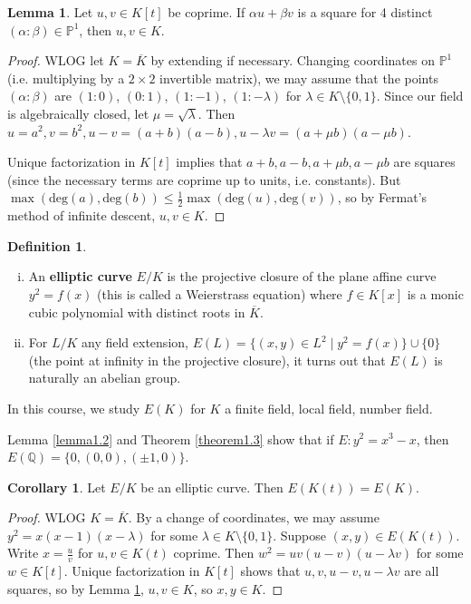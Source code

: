 \documentclass{article}
\theoremstyle{definition}
\newtheorem{lemma}[theorem]{Lemma}
\newtheorem{cor}[theorem]{Corollary}
\newtheorem{defn}{Definition}[section]
\begin{document}
\begin{lemma}\label{lemma1.4}
    Let $u,v \in K[t]$ be coprime. If $\alpha u + \beta v$ is a square for 4 distinct $(\alpha : \beta) \in \mathbb{P}^1$, then $u, v \in K$.
\end{lemma}
\begin{proof}
    WLOG let $K = \overline{K}$ by extending if necessary. Changing coordinates on $\mathbb{P}^1$ (i.e. multiplying by a $2 \times 2$ invertible matrix), we may assume that the points $(\alpha : \beta)$ are $(1 : 0)$, $(0 : 1)$, $(1: -1)$, $(1: - \lambda)$ for $\lambda \in K \setminus \{0,1\}$. Since our field is algebraically closed, let $\mu = \sqrt{\lambda}$. Then $u = a^2, v = b^2, u-v = (a+b)(a-b), u - \lambda v = (a + \mu b)(a - \mu b)$.
    \vspace{1mm}
     
    Unique factorization in $K[t]$ implies that $a+b, a-b, a+ \mu b, a- \mu b$ are squares (since the necessary terms are coprime up to units, i.e. constants). But $\max(\text{deg}(a), \text{deg}(b)) \le \frac{1}{2}\max(\text{deg}(u),\text{deg}(v))$, so by Fermat's method of infinite descent, $u, v \in K$.
\end{proof}
\begin{defn}
    \begin{enumerate}[(i)]
        \item An \textbf{elliptic curve} $E/K$ is the projective closure of the plane affine curve $y^2 = f(x)$ (this is called a Weierstrass equation) where $f \in K[x]$ is a monic cubic polynomial with distinct roots in $\overline{K}$.
        \item For $L/K$ any field extension, $E(L) = \{(x,y) \in L^2 \mid y^2 = f(x)\} \cup \{0\}$ (the point at infinity in the projective closure), it turns out that $E(L)$ is naturally an abelian group.  
    \end{enumerate}
\end{defn}
In this course, we study $E(K)$ for $K$ a finite field, local field, number field.
\vspace{1mm}
 
Lemma \ref{lemma1.2} and Theorem \ref{theorem1.3} show that if $E : y^2 = x^3-x$, then $E(\mathbb{Q}) = \{0, (0,0), (\pm 1, 0)\}$.

\begin{cor}
    Let $E/K$ be an elliptic curve. Then $E(K(t)) = E(K)$.
\end{cor}
\begin{proof}
    WLOG $K = \overline{K}$. By a change of coordinates, we may assume $y^2 = x(x-1)(x-\lambda)$ for some $\lambda \in K\setminus \{0,1\}$. Suppose $(x,y) \in E(K(t))$. Write $x = \frac{u}{v}$ for $u,v \in K(t)$ coprime. Then $w^2 = uv(u-v)(u-\lambda v)$ for some $w \in K[t]$. Unique factorization in $K[t]$ shows that $u,v, u-v, u- \lambda v$ are all squares, so by Lemma \ref{lemma1.4}, $u, v \in K$, so $x, y \in K$.
\end{proof}
\end{document}
